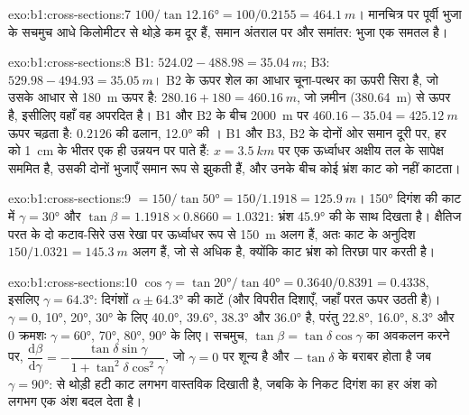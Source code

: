 \begin{solution}{exo:b1:cross-sections:7}
$100/\tan\ang{12.16} = 100/0.2155 = \qty{464.1}{m}$। मानचित्र पर पूर्वी भुजा के  सचमुच आधे किलोमीटर
से थोड़े कम दूर हैं, समान अंतराल पर और समांतर: भुजा एक समतल है।
\end{solution}

\begin{solution}{exo:b1:cross-sections:8}
B1: $524.02 - 488.98 = \qty{35.04}{m}$; B3: $529.98 - 494.93 =
\qty{35.05}{m}$। B2 के ऊपर शेल का आधार चूना-पत्थर का ऊपरी सिरा है, जो उसके आधार से \qty{180}{m} ऊपर है:
$280.16 + 180 = \qty{460.16}{m}$, जो ज़मीन (\qty{380.64}{m}) से ऊपर है, इसीलिए वहाँ वह अपरदित है।
B1 और B2 के बीच  \qty{2000}{m} पर $460.16 - 35.04 = \qty{425.12}{m}$ ऊपर चढ़ता है: $0.2126$ की ढलान,
\ang{12.0} की । B1 और B3, B2 के दोनों ओर समान दूरी पर, हर  को \qty{1}{cm} के भीतर एक ही उन्नयन पर
पाते हैं:  $x = \qty{3.5}{km}$ पर एक ऊर्ध्वाधर अक्षीय तल के सापेक्ष सममित है, उसकी दोनों भुजाएँ समान रूप से
झुकती हैं, और उनके बीच कोई भ्रंश काट को नहीं काटता।
\end{solution}

\begin{solution}{exo:b1:cross-sections:9}
 $= 150/\tan\ang{50} = 150/1.1918 = \qty{125.9}{m}$। \ang{150} दिगंश की काट में $\gamma = \ang{30}$ और
$\tan\beta = 1.1918\times0.8660 =
1.0321$: भ्रंश \ang{45.9} की  के साथ दिखता है। क्षैतिज परत के दो कटाव-सिरे उस रेखा पर ऊर्ध्वाधर रूप से
\qty{150}{m} अलग हैं, अतः काट के अनुदिश $150/1.0321 = \qty{145.3}{m}$ अलग हैं, जो  से अधिक है,
क्योंकि काट भ्रंश को तिरछा पार करती है।
\end{solution}

\begin{solution}{exo:b1:cross-sections:10}
$\cos\gamma = \tan\ang{20}/\tan\ang{40} = 0.3640/0.8391 = 0.4338$, इसलिए
$\gamma = \ang{64.3}$: दिगंशों $\alpha \pm \ang{64.3}$ की काटें (और विपरीत दिशाएँ, जहाँ परत ऊपर उठती है)। 
$\gamma = 0$, \ang{10}, \ang{20}, \ang{30} के लिए \ang{40.0}, \ang{39.6}, \ang{38.3} और \ang{36.0} है, परंतु
\ang{22.8}, \ang{16.0}, \ang{8.3} और $0$ क्रमशः $\gamma = \ang{60}$, \ang{70}, \ang{80}, \ang{90} के लिए। सचमुच, $\tan\beta = \tan\delta\cos\gamma$ का अवकलन करने पर,
$\dfrac{\mathrm d\beta}{\mathrm d\gamma} =
-\dfrac{\tan\delta\sin\gamma}{1 + \tan^2\delta\cos^2\gamma}$, जो $\gamma = 0$ पर शून्य है और
$-\tan\delta$ के बराबर होता है जब $\gamma = \ang{90}$:  से थोड़ी हटी काट लगभग वास्तविक  दिखाती है, जबकि  के निकट दिगंश का
हर अंश  को लगभग एक अंश बदल देता है।
\end{solution}

